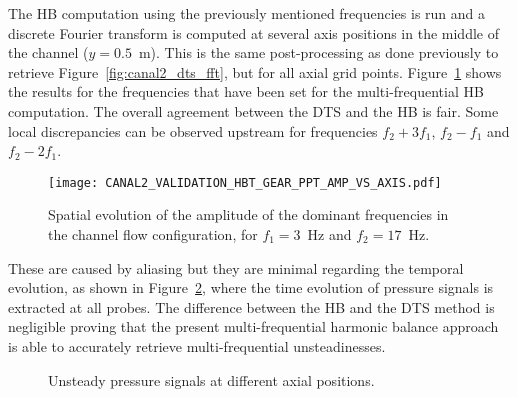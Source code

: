 The HB computation using the previously mentioned frequencies is
run and a discrete Fourier transform is computed at several axis positions
in the middle of the channel ($y=0.5$~m). 
This is the same post-processing as done previously to retrieve 
Figure~\ref{fig:canal2_dts_fft}, but for all axial grid points.
Figure~\ref{fig:canal2_validation_hbt_gear_amp_vs_axis}
shows the results for the frequencies that have been set for the 
multi-frequential HB computation.
The overall agreement between the DTS and the HB is fair.  
Some local discrepancies can be
observed upstream for frequencies $f_2 + 3f_1$, $f_2 - f_1$ and $f_2 -
2f_1$. 
\begin{figure}[htp]
  \centering
  \texttt{[image: CANAL2\_VALIDATION\_HBT\_GEAR\_PPT\_AMP\_VS\_AXIS.pdf]}
  \caption{Spatial evolution of the amplitude of the dominant
    frequencies in the channel flow configuration, for $f_1 = 3$~Hz and $f_2 = 17$~Hz.}
  \label{fig:canal2_validation_hbt_gear_amp_vs_axis}
\end{figure}
These are caused by aliasing
but they are minimal regarding the temporal evolution, as
shown in Figure~\ref{fig:canal2_validation_hbt_gear_time_ev}, where the
time evolution of pressure signals is extracted at all probes.  The
difference between the HB and the DTS method is negligible proving
that the present multi-frequential harmonic balance approach is
able to accurately retrieve multi-frequential unsteadinesses.
\begin{figure}[htp]
  \centering 
   \quad{}
  \caption{Unsteady pressure signals at different axial positions.}
  \label{fig:canal2_validation_hbt_gear_time_ev}
\end{figure}
